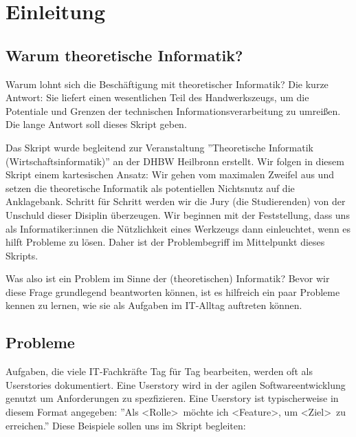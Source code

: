\chapter{Einleitung}\label{einleitung}
\section{Warum theoretische Informatik?}
Warum lohnt sich die Beschäftigung mit theoretischer Informatik?
Die kurze Antwort: Sie liefert einen wesentlichen Teil des Handwerkszeugs,
um die Potentiale und Grenzen der technischen Informationsverarbeitung zu umreißen.
Die lange Antwort soll dieses Skript geben.

Das Skript wurde begleitend zur Veranstaltung
''Theoretische Informatik (Wirtschaftsinformatik)''
an der DHBW Heilbronn erstellt.
Wir folgen in diesem Skript einem kartesischen Ansatz:
Wir gehen vom maximalen Zweifel aus und setzen die theoretische Informatik
als potentiellen Nichtsnutz auf die Anklagebank.
Schritt für Schritt werden wir die Jury (die Studierenden) von der Unschuld dieser
Disiplin überzeugen.
Wir beginnen mit der Feststellung, dass uns als Informatiker:innen die Nützlichkeit
eines Werkzeugs dann einleuchtet, wenn es hilft Probleme zu lösen.
Daher ist der Problembegriff im Mittelpunkt dieses Skripts.

Was also ist ein Problem im Sinne der (theoretischen) Informatik?
Bevor wir diese Frage grundlegend beantworten können,
ist es hilfreich ein paar Probleme kennen zu lernen,
wie sie als Aufgaben im IT-Alltag auftreten können.

\section{Probleme}
Aufgaben, die viele IT-Fachkräfte Tag für Tag bearbeiten,
werden oft als Userstories dokumentiert.
Eine Userstory wird in der agilen Softwareentwicklung genutzt um Anforderungen zu spezfizieren.
Eine Userstory ist typischerweise in diesem Format angegeben:
''Als \textless Rolle\textgreater\ möchte ich \textless Feature\textgreater,
um \textless Ziel\textgreater\ zu erreichen.''
Diese Beispiele sollen uns im Skript begleiten:

